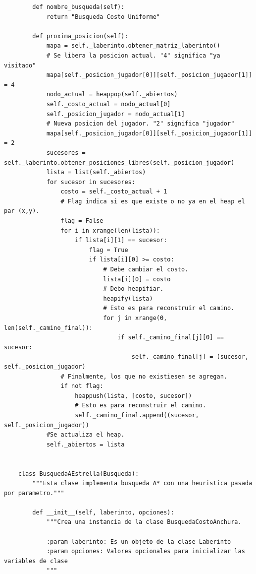 \documentclass[letter, titlepage, 10pt]{article}
\begin{document}
\begin{lstlisting}
        def nombre_busqueda(self):
            return "Busqueda Costo Uniforme"
        
        def proxima_posicion(self):
            mapa = self._laberinto.obtener_matriz_laberinto()
            # Se libera la posicion actual. "4" significa "ya visitado"
            mapa[self._posicion_jugador[0]][self._posicion_jugador[1]] = 4
            nodo_actual = heappop(self._abiertos)
            self._costo_actual = nodo_actual[0]
            self._posicion_jugador = nodo_actual[1]
            # Nueva posicion del jugador. "2" significa "jugador"
            mapa[self._posicion_jugador[0]][self._posicion_jugador[1]] = 2
            sucesores = self._laberinto.obtener_posiciones_libres(self._posicion_jugador)
            lista = list(self._abiertos)
            for sucesor in sucesores:
                costo = self._costo_actual + 1
                # Flag indica si es que existe o no ya en el heap el par (x,y).
                flag = False
                for i in xrange(len(lista)):
                    if lista[i][1] == sucesor:
                        flag = True
                        if lista[i][0] >= costo:
                            # Debe cambiar el costo.
                            lista[i][0] = costo
                            # Debo heapifiar.
                            heapify(lista)
                            # Esto es para reconstruir el camino.
                            for j in xrange(0, len(self._camino_final)):
                                if self._camino_final[j][0] == sucesor:
                                    self._camino_final[j] = (sucesor, self._posicion_jugador)
                # Finalmente, los que no existiesen se agregan.
                if not flag:
                    heappush(lista, [costo, sucesor])
                    # Esto es para reconstruir el camino.
                    self._camino_final.append((sucesor, self._posicion_jugador))
            #Se actualiza el heap.
            self._abiertos = lista
    
    
    class BusquedaAEstrella(Busqueda):
        """Esta clase implementa busqueda A* con una heuristica pasada por parametro."""
    
        def __init__(self, laberinto, opciones):
            """Crea una instancia de la clase BusquedaCostoAnchura.
    
            :param laberinto: Es un objeto de la clase Laberinto
            :param opciones: Valores opcionales para inicializar las variables de clase
            """
    

\end{lstlisting}
\end{document}
